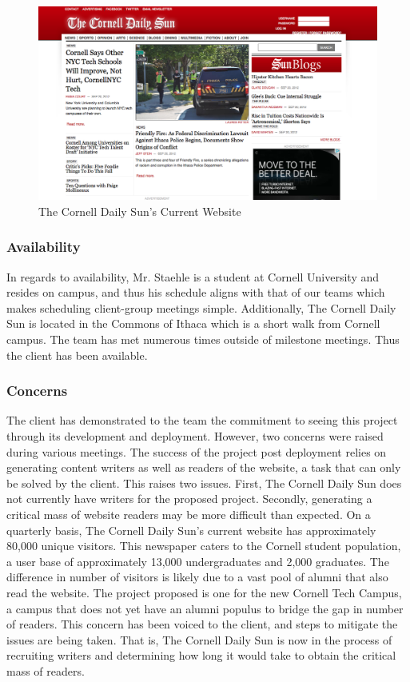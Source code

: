 \documentclass[11pt]{article} %
\begin{document}
\begin{figure}[h]
\begin{center}
\includegraphics[width=\columnwidth]{images/cornell_sun_current}
\end{center}
\caption{The Cornell Daily Sun's Current Website}
\end{figure}

\subsubsection{Availability}

In regards to availability, Mr. Staehle is a student at Cornell University and resides on campus, and thus his schedule aligns with that of our teams which makes scheduling client-group meetings simple. Additionally, The Cornell Daily Sun is located in the Commons of Ithaca which is a short walk from Cornell campus. The team has met numerous times outside of milestone meetings. Thus the client has been available.

\subsubsection{Concerns}

The client has demonstrated to the team the commitment to seeing this project through its development and deployment. However, two concerns were raised during various meetings. The success of the project post deployment relies on generating content writers as well as readers of the website, a task that can only be solved by the client. This raises two issues. First, The Cornell Daily Sun does not currently have writers for the proposed project. Secondly, generating a critical mass of website readers may be more difficult than expected. On a quarterly basis, The Cornell Daily Sun’s current website has approximately 80,000 unique visitors. This newspaper caters to the Cornell student population, a user base of approximately 13,000 undergraduates and 2,000 graduates. The difference in number of visitors is likely due to a vast pool of alumni that also read the website. The project proposed is one for the new Cornell Tech Campus, a campus that does not yet have an alumni populus to bridge the gap in number of readers. This concern has been voiced to the client, and steps to mitigate the issues are being taken. That is, The Cornell Daily Sun is now in the process of recruiting writers and determining how long it would take to obtain the critical mass of readers.
\end{document}
